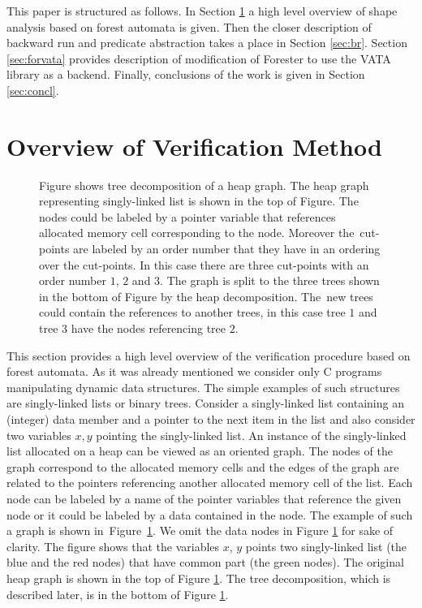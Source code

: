 \documentclass[fleqn,11pt]{ExcelAtFIT} %
\begin{document}
This paper is structured as follows.
In Section \ref{sec:overview} a high level overview of shape analysis based on forest automata
is given.
Then the closer description of backward run and predicate abstraction takes a place in Section \ref{sec:br}.
Section \ref{sec:forvata} provides description of modification of Forester to use the VATA library as a backend.
Finally, conclusions of the work is given in Section \ref{sec:concl}.

\section{Overview of Verification Method}
\label{sec:overview}

\begin{figure}[t]
	\centering
	
	
	\vspace{0.5cm}
	
	
	\caption{
	Figure shows tree decomposition of a heap graph.
    The heap graph representing singly-linked list is shown in the top of Figure.
	The nodes could be labeled by a pointer variable that references allocated memory cell
	corresponding to the node.
	Moreover the~cut-points are labeled by an order number that they have in an ordering over
	the cut-points.
	In this case there are three cut-points with an order number $1$, $2$ and $3$.
	The graph is split to the three trees shown in the bottom of Figure by the heap decomposition.
	The~new trees could contain the references to another trees, in this case tree $1$ and tree $3$
	have the nodes referencing tree $2$.}
	\label{fig:graph}
\end{figure}

This section provides a high level overview of the verification procedure based
on forest automata.
As it was already mentioned we consider only C programs manipulating dynamic data structures.
The simple examples of such structures are singly-linked lists or binary trees.
Consider a singly-linked list containing an (integer) data member and a pointer
to the next item in the list and also
consider two variables $x,y$ pointing the singly-linked list.
An instance of the singly-linked list allocated on a heap can be viewed as an oriented graph.
The nodes of the graph correspond to the allocated memory cells
and the edges of the graph are related to the pointers referencing
another allocated memory cell of the list.
Each node can be labeled by a name of the pointer variables that
reference the given node or it could be labeled by a data contained in the node.
The example of such a graph is shown in~Figure~\ref{fig:graph}.
We omit the data nodes in Figure \ref{fig:graph} for sake of clarity.
The figure shows that the variables $x$, $y$ points two singly-linked list (the blue and the red nodes) that
have common part (the green nodes).
The original heap graph is shown in the top of Figure \ref{fig:graph}.
The tree decomposition, which is described later, is in the bottom of Figure \ref{fig:graph}.
\end{document}

